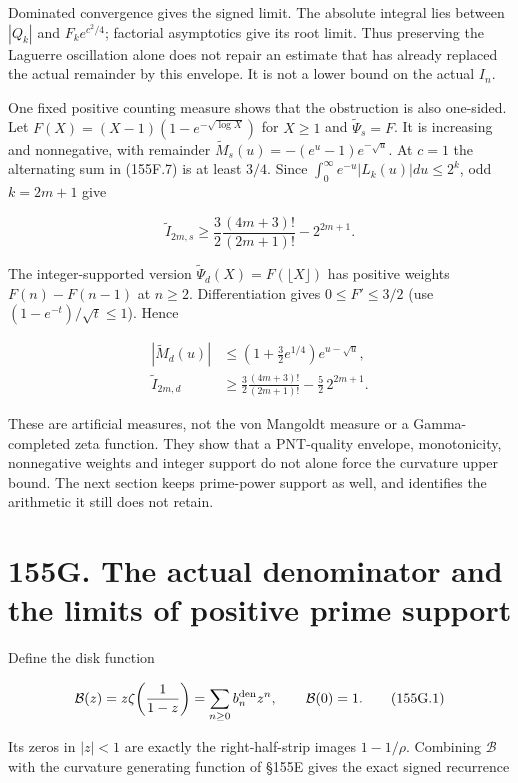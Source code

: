\documentclass[
  11pt,
]{book}
\begin{document}
Dominated convergence gives the signed limit. The absolute integral lies
between \(|Q_k|\) and \(F_ke^{c^2/4}\); factorial asymptotics give its
root limit. Thus preserving the Laguerre oscillation alone does not
repair an estimate that has already replaced the actual remainder by
this envelope. It is not a lower bound on the actual \(I_n\).

One fixed positive counting measure shows that the obstruction is also
one-sided. Let \(F(X)=(X-1)(1-e^{-\sqrt{\log X}})\) for \(X\ge1\) and
\(\widetilde\Psi_s=F\). It is increasing and nonnegative, with remainder
\(\widetilde M_s(u)=-(e^u-1)e^{-\sqrt u}\). At \(c=1\) the alternating
sum in (155F.7) is at least \(3/4\). Since
\(\int_0^\infty e^{-u}|L_k(u)|du\le2^k\), odd \(k=2m+1\) give

\[
 \widetilde I_{2m,s}\ge
 \frac32\frac{(4m+3)!}{(2m+1)!}-2^{2m+1}.
\tag{155F.8}
\]

The integer-supported version
\(\widetilde\Psi_d(X)=F(\lfloor X\rfloor)\) has positive weights
\(F(n)-F(n-1)\) at \(n\ge2\). Differentiation gives \(0\le F'\le3/2\)
(use \((1-e^{-t})/\sqrt t\le1\)). Hence

\[
\begin{aligned}
|\widetilde M_d(u)|&\le(1+\tfrac32e^{1/4})e^{u-\sqrt u},\\
\widetilde I_{2m,d}&\ge
\frac32\frac{(4m+3)!}{(2m+1)!}-\frac52\,2^{2m+1}.
\end{aligned}
\tag{155F.9}
\]

These are artificial measures, not the von Mangoldt measure or a
Gamma-completed zeta function. They show that a PNT-quality envelope,
monotonicity, nonnegative weights and integer support do not alone force
the curvature upper bound. The next section keeps prime-power support as
well, and identifies the arithmetic it still does not retain.

\section{155G. The actual denominator and the limits of positive prime
support}\label{g.-the-actual-denominator-and-the-limits-of-positive-prime-support}

Define the disk function

\[
\mathcal B(z)=z\zeta\!\left(\frac1{1-z}\right)
=\sum_{n\ge0}b_n^{\rm den}z^n,
\qquad \mathcal B(0)=1.
\tag{155G.1}
\]

Its zeros in \(|z|<1\) are exactly the right-half-strip images
\(1-1/\rho\). Combining \(\mathcal B\) with the curvature generating
function of §155E gives the exact signed recurrence
\end{document}
